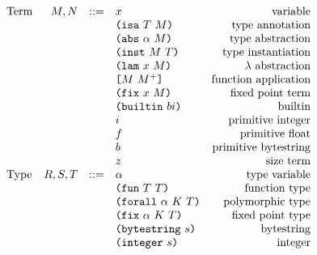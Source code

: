 \documentclass[../main.tex]{subfiles}
\begin{document}
\begin{figure*}[t]
    \centering
    \[\begin{array}{lrclr}
        \textrm{Term}             & M, N   & ::= & x                          & \textrm{variable}\\
                                  &     &     & \ann{M}{T}                 & \textrm{type annotation}\\
                                  &     &     & \abs{\alpha}{M}            & \textrm{type abstraction}\\
                                  &     &     & \inst{M}{T}                & \textrm{type instantiation}\\
                                  &     &     & \lam{x}{M}                 & \textrm{$\lambda$ abstraction}\\
                                  &     &     & \app{M}{M^+}               & \textrm{function application}\\
                                  &     &     & \fix{x}{M}                 & \textrm{fixed point term}\\
                                  &     &     & \builtin{bi}               & \textrm{builtin}\\
                                  &     &     & i                          & \textrm{primitive integer}\\
                                  &     &     & f                          & \textrm{primitive float}\\
                                  &     &     & b                          & \textrm{primitive bytestring}\\
                                  &     &     & z                          & \textrm{size term}\\
        \textrm{Type}             & R,S,T & ::= & \alpha                     & \textrm{type variable}\\
                                  &     &     & \funT{T}{T}                & \textrm{function type}\\
                                  &     &     & \forallT{\alpha}{K}{T}     & \textrm{polymorphic type}\\
                                  &     &     & \fixT{\alpha}{K}{T}        & \textrm{fixed point type}\\
                                  &     &     & \bytestringT{s}            & \textrm{bytestring}\\
                                  &     &     & \integerT{s}               & \textrm{integer}\\

\end{array}\]
\end{figure*}
\end{document}
